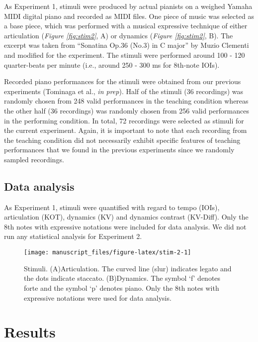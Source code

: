 \documentclass[
  man,floatsintext]{apa6}
\begin{document}
As Experiment 1, stimuli were produced by actual pianists on a weighed Yamaha MIDI digital piano and recorded as MIDI files. One piece of music was selected as a base piece, which was performed with a musical expressive technique of either articulation (\emph{Figure \ref{fig:stim2}}, A) or dynamics (\emph{Figure \ref{fig:stim2}}, B). The excerpt was taken from ``Sonatina Op.36 (No.3) in C major'' by Muzio Clementi and modified for the experiment. The stimuli were performed around 100 - 120 quarter-beats per minute (i.e., around 250 - 300 ms for 8th-note IOIs).

Recorded piano performances for the stimuli were obtained from our previous experiments (Tominaga et al., \emph{in prep}). Half of the stimuli (36 recordings) was randomly chosen from 248 valid performances in the teaching condition whereas the other half (36 recordings) was randomly chosen from 256 valid performances in the performing condition. In total, 72 recordings were selected as stimuli for the current experiment. Again, it is important to note that each recording from the teaching condition did not necessarily exhibit specific features of teaching performances that we found in the previous experiments since we randomly sampled recordings.

\hypertarget{dataanalysis2}{%
\subsection{Data analysis}\label{dataanalysis2}}

As Experiment 1, stimuli were quantified with regard to tempo (IOIs), articulation (KOT), dynamics (KV) and dynamics contrast (KV-Diff). Only the 8th notes with expressive notations were included for data analysis. We did not run any statistical analysis for Experiment 2.

\begin{figure}
\texttt{[image: manuscript\_files/figure-latex/stim-2-1]} \caption{\label{fig:stim2}Stimuli. (A)Articulation. The curved line (slur) indicates legato and the dots indicate staccato. (B)Dynamics. The symbol `f' denotes forte and the symbol `p' denotes piano. Only the 8th notes with expressive notations were used for data analysis.}\label{fig:stim-2}
\end{figure}

\hypertarget{results-1}{%
\section{Results}\label{results-1}}
\end{document}
